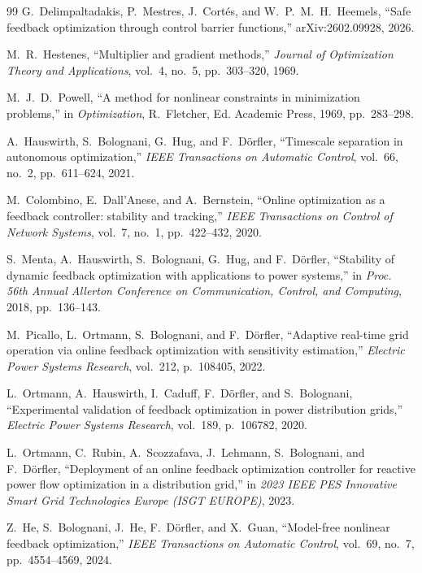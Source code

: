 \documentclass[11pt,onecolumn]{article}
\theoremstyle{definition}
\theoremstyle{remark}
\begin{document}
\begin{thebibliography}{99}
 G.~Delimpaltadakis, P.~Mestres, J.~Cort\'es, and
  W.~P.~M.~H.~Heemels, ``Safe feedback optimization through control barrier functions,''
  arXiv:2602.09928, 2026.



 M.~R.~Hestenes, ``Multiplier and gradient methods,'' \emph{Journal of
  Optimization Theory and Applications}, vol.~4, no.~5, pp.~303--320, 1969.

 M.~J.~D.~Powell, ``A method for nonlinear constraints in minimization
  problems,'' in \emph{Optimization}, R.~Fletcher, Ed. Academic Press, 1969, pp.~283--298.

 A.~Hauswirth, S.~Bolognani, G.~Hug, and F.~D\"orfler, ``Timescale
  separation in autonomous optimization,'' \emph{IEEE Transactions on Automatic Control},
  vol.~66, no.~2, pp.~611--624, 2021.

 M.~Colombino, E.~Dall'Anese, and A.~Bernstein, ``Online optimization as
  a feedback controller: stability and tracking,'' \emph{IEEE Transactions on Control of
  Network Systems}, vol.~7, no.~1, pp.~422--432, 2020.

 S.~Menta, A.~Hauswirth, S.~Bolognani, G.~Hug, and F.~D\"orfler, ``Stability
  of dynamic feedback optimization with applications to power systems,'' in \emph{Proc. 56th
  Annual Allerton Conference on Communication, Control, and Computing}, 2018, pp.~136--143.

 M.~Picallo, L.~Ortmann, S.~Bolognani, and F.~D\"orfler, ``Adaptive
  real-time grid operation via online feedback optimization with sensitivity estimation,''
  \emph{Electric Power Systems Research}, vol.~212, p.~108405, 2022.

 L.~Ortmann, A.~Hauswirth, I.~Caduff, F.~D\"orfler, and S.~Bolognani,
  ``Experimental validation of feedback optimization in power distribution grids,''
  \emph{Electric Power Systems Research}, vol.~189, p.~106782, 2020.

 L.~Ortmann, C.~Rubin, A.~Scozzafava, J.~Lehmann, S.~Bolognani, and
  F.~D\"orfler, ``Deployment of an online feedback optimization controller for reactive power
  flow optimization in a distribution grid,'' in \emph{2023 IEEE PES Innovative Smart Grid
  Technologies Europe (ISGT EUROPE)}, 2023.

 Z.~He, S.~Bolognani, J.~He, F.~D\"orfler, and X.~Guan, ``Model-free nonlinear
  feedback optimization,'' \emph{IEEE Transactions on Automatic Control}, vol.~69, no.~7,
  pp.~4554--4569, 2024.


\end{thebibliography}
\end{document}
